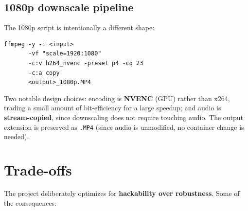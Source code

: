 \documentclass[11pt,a4paper]{article}
\begin{document}
\subsection{1080p downscale pipeline}

\noindent
The 1080p script is intentionally a different shape:

\begin{lstlisting}
ffmpeg -y -i <input>
       -vf "scale=1920:1080"
       -c:v h264_nvenc -preset p4 -cq 23
       -c:a copy
       <output>_1080p.MP4
\end{lstlisting}

\noindent
Two notable design choices: encoding is \textbf{NVENC} (GPU)
rather than x264, trading a small amount of bit-efficiency for a large
speedup; and audio is \textbf{stream-copied}, since downscaling does
not require touching audio. The output extension is preserved as
\texttt{.MP4} (since audio is unmodified, no container change is
needed).

\section{Trade-offs}

The project deliberately optimizes for \textbf{hackability over
robustness}. Some of the consequences:
\end{document}
